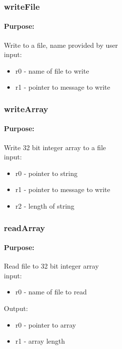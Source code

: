 \documentclass{article}
\begin{document}
        \subsubsection{writeFile}
        \paragraph*{Purpose:}
            {Write to a file, name provided by user \\ }
            input:\begin{itemize}
                \item r0 - name of file to write
                \item r1 - pointer to message to write
            \end{itemize}
            
        \subsubsection{writeArray}
        \paragraph*{Purpose:}
            {Write 32 bit integer array to a file \\ }
            input:\begin{itemize}
                \item r0 - pointer to string
                \item r1 - pointer to message to write
                \item r2 - length of string
            \end{itemize}

        \subsubsection{readArray}
        \paragraph*{Purpose:}
            {Read file to 32 bit integer array \\ }
            input:\begin{itemize}
                \item r0 - name of file to read
            \end{itemize}
            Output:\begin{itemize}
                \item r0 - pointer to array
                \item r1 - array length
            \end{itemize}
\end{document}
